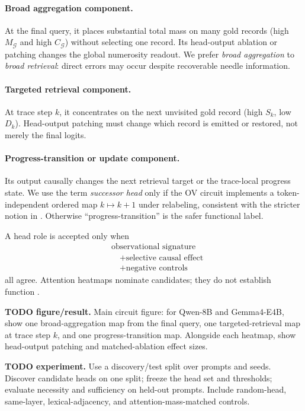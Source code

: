 \documentclass[10pt,twocolumn]{article}
\newcommand{\todoexp}[1]{%
  \par\noindent\textcolor{red!75!black}{\textbf{TODO experiment.} #1}\par}
\newcommand{\todoplot}[1]{%
  \par\noindent\textcolor{red!75!black}{\textbf{TODO figure/result.} #1}\par}
\begin{document}
\paragraph{Broad aggregation component.}
At the final query, it places substantial total mass on many gold records
(high $M_{\mathcal G}$ and high $C_{\mathcal G}$) without selecting one record.
Its head-output ablation or patching changes the global numerosity readout.
We prefer \emph{broad aggregation} to \emph{broad retrieval}: direct errors may occur despite
recoverable needle information.

\paragraph{Targeted retrieval component.}
At trace step $k$, it concentrates on the next unvisited gold record
(high $S_k$, low $D_k$). Head-output patching must change which record is emitted or restored,
not merely the final logits.

\paragraph{Progress-transition or update component.}
Its output causally changes the next retrieval target or the trace-local progress state.
We use the term \emph{successor head} only if the OV circuit implements a token-independent
ordered map $k\mapsto k+1$ under relabeling, consistent with the stricter notion in
\citet{gould2023successor}. Otherwise ``progress-transition'' is the safer functional label.

A head role is accepted only when
\[
\begin{aligned}
&\text{observational signature}\\[-1mm]
&\quad+\text{selective causal effect}\\[-1mm]
&\quad+\text{negative controls}
\end{aligned}
\]
all agree. Attention heatmaps nominate candidates; they do not establish function
\citep{zhang2024patching}.

\todoplot{Main circuit figure: for Qwen-8B and Gemma4-E4B, show one broad-aggregation map from
the final query, one targeted-retrieval map at trace step $k$, and one progress-transition map.
Alongside each heatmap, show head-output patching and matched-ablation effect sizes.}

\todoexp{Use a discovery/test split over prompts and seeds. Discover candidate heads on one split;
freeze the head set and thresholds; evaluate necessity and sufficiency on held-out prompts.
Include random-head, same-layer, lexical-adjacency, and attention-mass-matched controls.}
\end{document}
